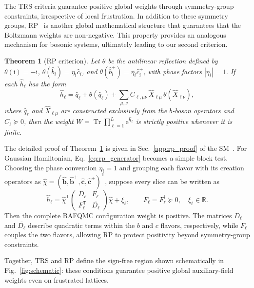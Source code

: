 \documentclass[twocolumn,aps,prl,amsmath,amssymb,superscriptaddress,longbibliography]{revtex4-2}
\newcommand{\Tr}{\operatorname{Tr}}
\newcommand{\ee}{\mathrm{e}}
\newcommand{\ii}{\mathrm{i}}
\newcommand{\trans}{\mathsf{T}}
\newcommand{\hc}{\dagger}
\newcommand{\bb}[1]{\bm{#1}}
\newtheorem{theorem}{Theorem}
\begin{document}
The TRS criteria guarantee positive global weights through symmetry-group constraints, irrespective of local frustration. In addition to these symmetry groups, RP~\cite{osterwalder1973axioms,lieb1989prl,wei2016prl} is another global mathematical structure that guarantees that the Boltzmann weights are non-negative. This property provides an analogous mechanism for bosonic systems, ultimately leading to our second criterion.

\begin{theorem}[RP criterion]
\label{thm:rp}
Let $\theta$ be the antilinear reflection defined by $\theta(\ii)=-\ii$, $\theta(\hat b_i)=\eta_i\hat c_i$, and $\theta(\hat b_i^+)=\overline{\eta_i}\hat c_i^+$, with phase factors $|\eta_i|=1$. If each $\hat h_\ell$ has the form
\begin{equation}
    \hat h_\ell =
    \hat q_\ell+\theta(\hat q_\ell)
    +\sum_{\mu,\nu} C_{\ell,\mu\nu}\,
    \hat X_{\ell\mu}\,\theta(\hat X_{\ell\nu}),
\label{eq:rp_generator}
\end{equation}
where $\hat q_\ell$ and $\hat X_{\ell\mu}$ are constructed exclusively from the $b$-boson operators and $C_\ell\succeq0$, then the weight $W=\Tr\prod_{\ell=1}^{L}\ee^{\hat h_\ell}$ is strictly positive whenever it is finite.
\end{theorem}
The detailed proof of Theorem~\ref{thm:rp} is given in Sec.~\ref{app:rp_proof} of the SM~\cite{SM}. For Gaussian Hamiltonian, Eq.~\eqref{eq:rp_generator} becomes a simple block test. Choosing the phase convention $\eta_i=1$ and grouping each flavor with its creation operators as $\hat\chi=(\hat{\bb b},\hat{\bb b}^+,\hat{\bb c},\hat{\bb c}^+)^\trans$, suppose every slice can be written as
\begin{equation}
    \hat h_\ell = \hat\chi^\trans
    \begin{pmatrix}
        D_\ell & F_\ell \\
        F_\ell^\trans & \overline{D_\ell}
    \end{pmatrix}
    \hat\chi + \xi_\ell,
    \qquad
    F_\ell=F_\ell^\hc\succeq0,\quad \xi_\ell\in\mathbb R .
    \label{eq:rp_block_form}
\end{equation}
Then the complete BAFQMC configuration weight is positive. The matrices $D_\ell$ and $\overline{D_\ell}$ describe quadratic terms within the $b$ and $c$ flavors, respectively, while $F_\ell$ couples the two flavors, allowing RP to protect positivity beyond symmetry-group constraints.

Together, TRS and RP define the sign-free region shown schematically in Fig.~\ref{fig:schematic}: these conditions guarantee positive global auxiliary-field weights even on frustrated lattices.
\end{document}

